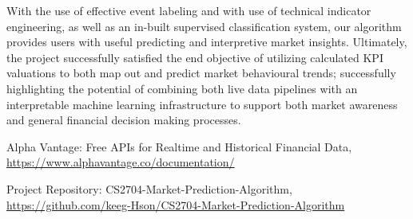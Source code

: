 \documentclass[runningheads]{llncs}
\begin{document}
With the use of effective event labeling and with use of technical indicator engineering, as well as an in-built supervised classification system, our algorithm provides users with useful predicting and interpretive market insights. Ultimately, the project successfully satisfied the end objective of utilizing calculated KPI valuations to both map out and predict market behavioural trends; successfully highlighting the potential of combining both live data pipelines with an interpretable machine learning infrastructure to support both market awareness and general financial decision making processes.

\begin{thebibliography}{1}
Alpha Vantage: Free APIs for Realtime and Historical Financial Data, \url{https://www.alphavantage.co/documentation/}

Project Repository: CS2704-Market-Prediction-Algorithm,
\url{https://github.com/keeg-Hson/CS2704-Market-Prediction-Algorithm}
\end{thebibliography}
\end{document}
